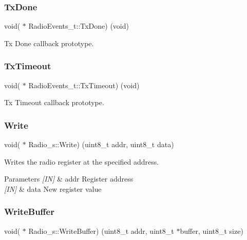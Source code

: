 \subsubsection{\texorpdfstring{Tx\+Done}{TxDone}}
{\footnotesize\ttfamily void( $\ast$ Radio\+Events\+\_\+t\+::\+Tx\+Done) (void)}



Tx Done callback prototype. 

\mbox{\label{group__LORA_ga1f435b15ceae4ce1e44af3d3c5845ffd}} 
\subsubsection{\texorpdfstring{Tx\+Timeout}{TxTimeout}}
{\footnotesize\ttfamily void( $\ast$ Radio\+Events\+\_\+t\+::\+Tx\+Timeout) (void)}



Tx Timeout callback prototype. 

\mbox{\label{group__LORA_ga5f0ca54e8bc3c82d3c9b196230c325d5}} 
\subsubsection{\texorpdfstring{Write}{Write}}
{\footnotesize\ttfamily void( $\ast$ Radio\+\_\+s\+::\+Write) (uint8\+\_\+t addr, uint8\+\_\+t data)}



Writes the radio register at the specified address. 


\begin{DoxyParams}{Parameters}
{\em \mbox{[}\+I\+N\mbox{]}} & addr Register address \\
\hline
{\em \mbox{[}\+I\+N\mbox{]}} & data New register value \\
\hline
\end{DoxyParams}
\mbox{\label{group__LORA_gab282c0d0a6bd7dd9f21cf79984988a8a}} 
\subsubsection{\texorpdfstring{Write\+Buffer}{WriteBuffer}}
{\footnotesize\ttfamily void( $\ast$ Radio\+\_\+s\+::\+Write\+Buffer) (uint8\+\_\+t addr, uint8\+\_\+t $\ast$buffer, uint8\+\_\+t size)}



